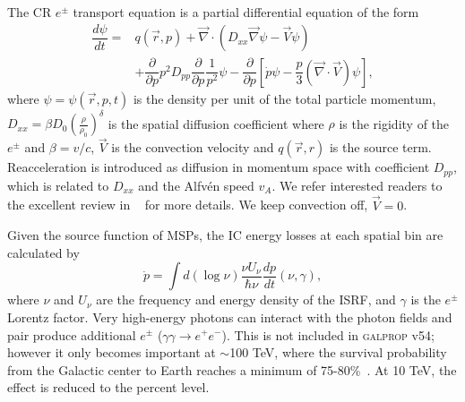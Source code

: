 \documentclass[doublespace,nopageskip]{VTthesis} %
\begin{document}
The CR $e^\pm$ transport equation is a partial differential equation of the form
\begin{align}
  \label{eq:prop_eq}
  \dfrac{d\psi}{dt} = &q(\vec{r},p)+\vec{\nabla}\cdot(D_{xx}\vec{\nabla}\psi-\vec{V}\psi)\nonumber\\
                       &+\dfrac{\partial}{\partial p}p^2D_{pp}\dfrac{\partial}{\partial p}\dfrac{1}{p^2}\psi-\dfrac{\partial}{\partial p}[\dot{p}\psi-\dfrac{p}{3}(\vec{\nabla}\cdot\vec{V})\psi],
\end{align}
where $\psi = \psi(\vec{r},p,t)$ is the density per unit of the total particle momentum, $D_{xx} = \beta D_0 (\frac{\rho}{\rho_0})^\delta$ is the spatial diffusion coefficient where $\rho$ is the rigidity of the $e^\pm$ and $\beta = v/c$, $\vec{V}$ is the convection velocity and $q(\vec{r},r)$ is the source term. Reacceleration is introduced as diffusion in momentum space with coefficient $D_{pp}$, which is related to $D_{xx}$ and the Alfv\'{e}n speed $v_A$. We refer interested readers to the excellent review in ~\citet{2007ARNPS..57..285S} for more details. We keep convection off, $\vec{V}=0$.

Given the source function of MSPs, the IC energy losses at each spatial bin are calculated by
\begin{equation}
  \dot{p} = \int d(\log{\nu})\dfrac{\nu U_\nu}{\hbar \nu}\dfrac{dp}{dt}(\nu,\gamma),
\end{equation}
where $\nu$ and $U_\nu$ are the frequency and energy density of the ISRF, and $\gamma$ is the $e^\pm$ Lorentz factor. Very high-energy photons can interact with the photon fields and pair produce additional $e^\pm$ ($\gamma\gamma \to e^+e^-$). This is not included in \textsc{galprop} v54; however it only becomes important at $\sim$100 TeV, where the survival probability from the Galactic center to Earth reaches a minimum of 75-80\%~\cite{2006ApJ...640L.155M}. At 10 TeV, the effect is reduced to the percent level.
\end{document}
